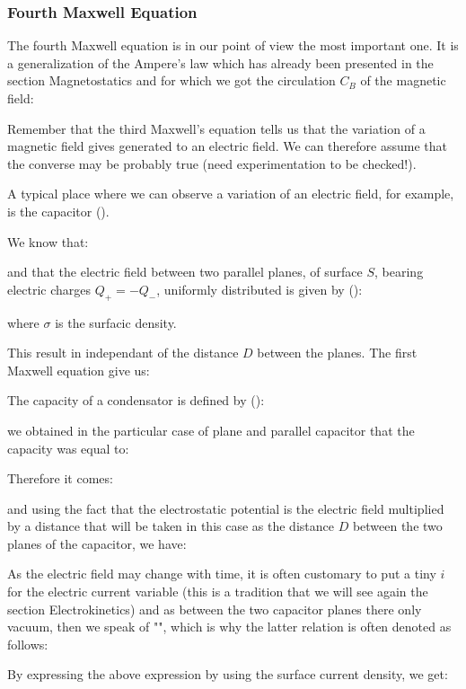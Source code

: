 	\subsubsection{Fourth Maxwell Equation}\label{fourth maxwell equation}
	The fourth Maxwell equation is in our point of view the most important one. It is a generalization of the Ampere's law which has already been presented in the section Magnetostatics and for which we got the circulation $C_B$ of the magnetic field:
	
	Remember that the third Maxwell's equation tells us that the variation of a magnetic field gives generated to an electric field. We can therefore assume that the converse may be probably true (need experimentation to be checked!).
	
	A typical place where we can observe a variation of an electric field, for example, is the capacitor ().
	
	We know that:
	
	and that the electric field between two parallel planes, of surface $S$, bearing electric charges $Q_+=-Q_-$, uniformly distributed is given by ():
	
	where $\sigma$ is the surfacic density.

	This result in independant of the distance $D$ between the planes. The first Maxwell equation give us:
	
	The capacity of a condensator is defined by ():
	
	we obtained in the particular case of plane and parallel capacitor that the capacity was equal to:
	
	Therefore it comes:
	
	and using the fact that the electrostatic potential is the electric field multiplied by a distance that will be taken in this case as the distance $D$ between the two planes of the capacitor, we have:
	
	As the electric field may change with time, it is often customary to put a tiny $i$ for the electric current variable (this is a tradition that we will see again the section Electrokinetics) and as between the two capacitor planes there only vacuum, then we speak of "", which is why the latter relation is often denoted as follows:
	
	By expressing the above expression by using the surface current density, we get:
	
